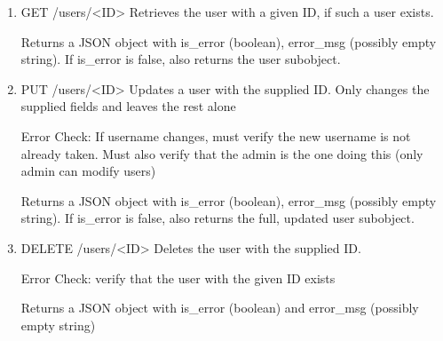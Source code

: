 \documentclass[12pt]{article}
\begin{document}
\begin{enumerate}
\item GET /users/<ID>
Retrieves the user with a given ID, if such a user exists. 

Returns a JSON object with is\_error (boolean), error\_msg (possibly empty string). If is\_error is false, also returns the user subobject. 

\item PUT /users/<ID>
Updates a user with the supplied ID. Only changes the supplied fields and leaves the rest alone

Error Check: If username changes, must verify the new username is not already taken. Must also verify that the admin is the one doing this (only admin can modify users)

Returns a JSON object with is\_error (boolean), error\_msg (possibly empty string). If is\_error is false, also returns the full, updated user subobject. 

\item DELETE /users/<ID>
Deletes the user with the supplied ID. 

Error Check: verify that the user with the given ID exists

Returns a JSON object with is\_error (boolean) and error\_msg (possibly empty string)
\end{enumerate}
\end{document}
